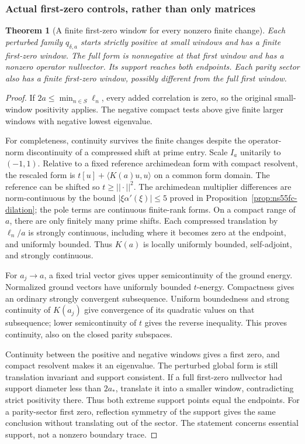 \documentclass[11pt]{article}
\def\norm#1{||#1||}%
\newtheorem{theorem}{Theorem}[section]
\theoremstyle{remark}
\newcommand{\norm}[1]{\left\lVert #1\right\rVert}
\begin{document}
\subsubsection*{Actual first-zero controls, rather than only matrices}
\begin{theorem}[A finite first-zero window for every nonzero finite change]\label{thm:ns57-first-zero-controls}
Each perturbed family $q_{\delta,a}$ starts strictly positive at small
windows and has a finite first-zero window. The full form is nonnegative
at that first window and has a nonzero operator nullvector. Its support
reaches both endpoints. Each parity sector also has a finite first-zero
window, possibly different from the full first window.
\end{theorem}
\begin{proof}
If $2a\le\min_{n\in S}\ell_n$, every added correlation is zero, so the
original small-window positivity applies. The negative compact tests
above give finite larger windows with negative lowest eigenvalue.

For completeness, continuity survives the finite changes despite the
operator-norm discontinuity of a compressed shift at prime entry.
Scale $I_a$ unitarily to $(-1,1)$. Relative to a fixed reference
archimedean form with compact resolvent, the rescaled form is
$t[u]+\langle K(a)u,u\rangle$ on a common form domain.
The reference can be shifted so $t\ge\norm{\cdot}^2$.
The archimedean multiplier differences are norm-continuous by the
bound $|\xi\alpha'(\xi)|\le5$ proved in Proposition~\ref{prop:ns55fc-dilation}; the pole terms are continuous
finite-rank forms. On a compact range of $a$, there are only finitely
many prime shifts. Each compressed translation by $\ell_n/a$ is
strongly continuous, including where it becomes zero at the endpoint,
and uniformly bounded. Thus $K(a)$ is locally uniformly bounded,
self-adjoint, and strongly continuous.

For $a_j\to a$, a fixed trial vector gives upper semicontinuity of
the ground energy. Normalized ground vectors have uniformly bounded
$t$-energy. Compactness gives an ordinary strongly convergent
subsequence. Uniform boundedness and strong continuity of $K(a_j)$
give convergence of its quadratic values on that subsequence; lower
semicontinuity of $t$ gives the reverse inequality. This proves
continuity, also on the closed parity subspaces.

Continuity between the positive and negative windows gives a first
zero, and compact resolvent makes it an eigenvalue. The perturbed
global form is still translation invariant and support consistent.
If a full first-zero nullvector had support diameter less than $2a_*$,
translate it into a smaller window, contradicting strict positivity
there. Thus both extreme support points equal the endpoints.
For a parity-sector first zero, reflection symmetry of the support
gives the same conclusion without translating out of the sector.
The statement concerns essential support, not a nonzero boundary trace.
\end{proof}
\end{document}
